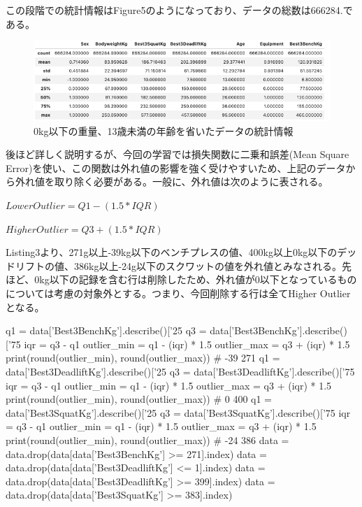 \documentclass{report}
\begin{document}
この段階での統計情報はFigure5のようになっており、データの総数は666284.である。


\begin{figure}[H]
\begin{center}
\includegraphics[width=\linewidth]{data_stats2.png}
\caption{0kg以下の重量、13歳未満の年齢を省いたデータの統計情報}
\end{center}
\end{figure}

後ほど詳しく説明するが、今回の学習では損失関数に二乗和誤差(Mean Square Error)を使い、この関数は外れ値の影響を強く受けやすいため、上記のデータから外れ値を取り除く必要がある。一般に、外れ値は次のように表される。

\begin{center}
\begin{math}
Lower Outlier = Q1 - (1.5 * IQR)
\end{math}
\end{center}
\begin{center}
\begin{math}
Higher Outlier = Q3 + (1.5 * IQR)
\end{math}
\end{center}


Listing3より、271g以上-39kg以下のベンチプレスの値、400kg以上0kg以下のデッドリフトの値、386kg以上-24g以下のスクワットの値を外れ値とみなされる。先ほど、0kg以下の記録を含む行は削除したため、外れ値が0以下となっているものについては考慮の対象外とする。つまり、今回削除する行は全てHigher Outlierとなる。
\\


\begin{python}[caption=外れ値の削除]
q1 = data['Best3BenchKg'].describe()['25%
q3 = data['Best3BenchKg'].describe()['75%
iqr = q3 - q1
outlier_min = q1 - (iqr) * 1.5
outlier_max = q3 + (iqr) * 1.5
print(round(outlier_min), round(outlier_max))
# -39 271
q1 = data['Best3DeadliftKg'].describe()['25%
q3 = data['Best3DeadliftKg'].describe()['75%
iqr = q3 - q1
outlier_min = q1 - (iqr) * 1.5
outlier_max = q3 + (iqr) * 1.5
print(round(outlier_min), round(outlier_max))
# 0 400
q1 = data['Best3SquatKg'].describe()['25%
q3 = data['Best3SquatKg'].describe()['75%
iqr = q3 - q1
outlier_min = q1 - (iqr) * 1.5
outlier_max = q3 + (iqr) * 1.5
print(round(outlier_min), round(outlier_max))
# -24 386
data = data.drop(data[data['Best3BenchKg'] >= 271].index)
data = data.drop(data[data['Best3DeadliftKg'] <= 1].index)
data = data.drop(data[data['Best3DeadliftKg'] >= 399].index)
data = data.drop(data[data['Best3SquatKg'] >= 383].index)
\end{python}
\end{document}
